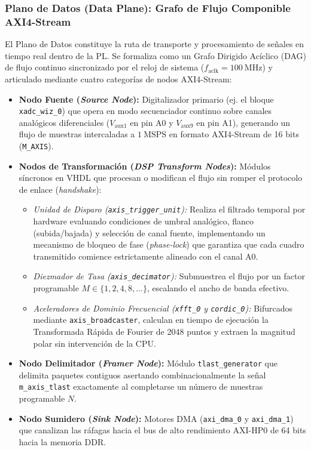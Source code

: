\documentclass[standalone]{subfiles}
\begin{document}
\subsubsection{Plano de Datos (Data Plane): Grafo de Flujo Componible AXI4-Stream}
\label{subsubsec:plano_datos}

El Plano de Datos constituye la ruta de transporte y procesamiento de señales en tiempo real dentro de la PL. Se formaliza como un Grafo Dirigido Acíclico (DAG) de flujo continuo sincronizado por el reloj de sistema ($f_{\text{aclk}} = 100~\text{MHz}$) y articulado mediante cuatro categorías de nodos AXI4-Stream:

\begin{itemize}
    \item \textbf{Nodo Fuente (\textit{Source Node}):} Digitalizador primario (ej. el bloque \texttt{xadc\_wiz\_0}) que opera en modo secuenciador continuo sobre canales analógicos diferenciales ($V_{\text{aux1}}$ en pin A0 y $V_{\text{aux9}}$ en pin A1), generando un flujo de muestras intercaladas a $1~\text{MSPS}$ en formato AXI4-Stream de 16 bits (\texttt{M\_AXIS}).
    
    \item \textbf{Nodos de Transformación (\textit{DSP Transform Nodes}):} Módulos síncronos en VHDL que procesan o modifican el flujo sin romper el protocolo de enlace (\textit{handshake}):
    \begin{itemize}
        \item \textit{Unidad de Disparo (\texttt{axis\_trigger\_unit}):} Realiza el filtrado temporal por hardware evaluando condiciones de umbral analógico, flanco (subida/bajada) y selección de canal fuente, implementando un mecanismo de bloqueo de fase (\textit{phase-lock}) que garantiza que cada cuadro transmitido comience estrictamente alineado con el canal A0.
        \item \textit{Diezmador de Tasa (\texttt{axis\_decimator}):} Submuestrea el flujo por un factor programable $M \in \{1, 2, 4, 8, \dots\}$, escalando el ancho de banda efectivo.
        \item \textit{Aceleradores de Dominio Frecuencial (\texttt{xfft\_0} y \texttt{cordic\_0}):} Bifurcados mediante \texttt{axis\_broadcaster}, calculan en tiempo de ejecución la Transformada Rápida de Fourier de 2048 puntos y extraen la magnitud polar sin intervención de la CPU.
    \end{itemize}
    
    \item \textbf{Nodo Delimitador (\textit{Framer Node}):} Módulo \texttt{tlast\_generator} que delimita paquetes contiguos asertando combinacionalmente la señal \texttt{m\_axis\_tlast} exactamente al completarse un número de muestras programable $N$.
    
    \item \textbf{Nodo Sumidero (\textit{Sink Node}):} Motores DMA (\texttt{axi\_dma\_0} y \texttt{axi\_dma\_1}) que canalizan las ráfagas hacia el bus de alto rendimiento AXI-HP0 de 64 bits hacia la memoria DDR.
\end{itemize}
\end{document}
